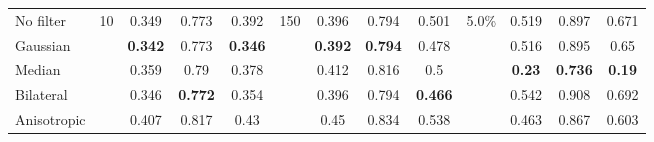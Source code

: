 \begin{table}[ht]
\begin{tabular}{rrrrrrrrrrrrr}
    
    \multicolumn{1}{l}{No filter} & \multirow{5}[2]{*}{10} & \multicolumn{1}{c}{0.349} & \multicolumn{1}{c}{0.773} & \multicolumn{1}{c}{0.392} & \multirow{5}[2]{*}{150} & \multicolumn{1}{c}{0.396} & \multicolumn{1}{c}{0.794} & \multicolumn{1}{c}{0.501} & \multirow{5}[2]{*}{5.0\%} & \multicolumn{1}{c}{0.519} & \multicolumn{1}{c}{0.897} & \multicolumn{1}{c}{0.671} \\
    \multicolumn{1}{l}{Gaussian} &       & \multicolumn{1}{c}{\textbf{0.342}} & \multicolumn{1}{c}{0.773} & \multicolumn{1}{c}{\textbf{0.346}} &       & \multicolumn{1}{c}{\textbf{0.392}} & \multicolumn{1}{c}{\textbf{0.794}} & \multicolumn{1}{c}{0.478} &       & \multicolumn{1}{c}{0.516} & \multicolumn{1}{c}{0.895} & \multicolumn{1}{c}{0.65} \\
    \multicolumn{1}{l}{Median} &       & \multicolumn{1}{c}{0.359} & \multicolumn{1}{c}{0.79} & \multicolumn{1}{c}{0.378} &       & \multicolumn{1}{c}{0.412} & \multicolumn{1}{c}{0.816} & \multicolumn{1}{c}{0.5} &       & \multicolumn{1}{c}{\textbf{0.23}} & \multicolumn{1}{c}{\textbf{0.736}} & \multicolumn{1}{c}{\textbf{0.19}} \\
    \multicolumn{1}{l}{Bilateral} &       & \multicolumn{1}{c}{0.346} & \multicolumn{1}{c}{\textbf{0.772}} & \multicolumn{1}{c}{0.354} &       & \multicolumn{1}{c}{0.396} & \multicolumn{1}{c}{0.794} & \multicolumn{1}{c}{\textbf{0.466}} &       & \multicolumn{1}{c}{0.542} & \multicolumn{1}{c}{0.908} & \multicolumn{1}{c}{0.692} \\
    \multicolumn{1}{l}{Anisotropic} &       & \multicolumn{1}{c}{0.407} & \multicolumn{1}{c}{0.817} & \multicolumn{1}{c}{0.43} &       & \multicolumn{1}{c}{0.45} & \multicolumn{1}{c}{0.834} & \multicolumn{1}{c}{0.538} &       & \multicolumn{1}{c}{0.463} & \multicolumn{1}{c}{0.867} & \multicolumn{1}{c}{0.603} \\
    
    \midrule
    

\end{tabular}
\end{table}
